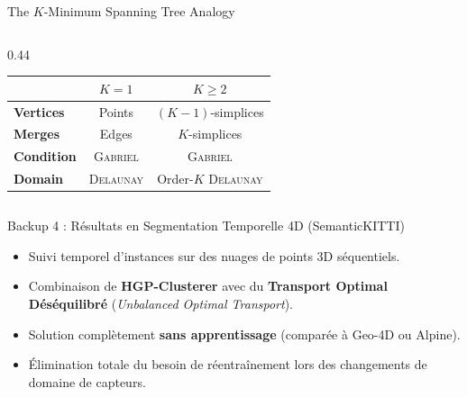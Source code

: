 \documentclass[A4,svgnames,9pt,aspectratio=169]{beamer}
\begin{document}
\begin{frame}{The $K$-Minimum Spanning Tree Analogy}
\begin{columns}[c, onlytextwidth]
\begin{column}{0.44\textwidth}
\begin{center}
                \vspace{0.5cm}
                \small
                \renewcommand{\arraystretch}{1.5}
                \begin{tabular}{lcc}
                    \toprule
                    & \textbf{$K = 1$} & \textbf{$K \ge 2$} \\
                    \midrule
                    \textbf{Vertices} & Points & $(K-1)$-simplices \\
                    \textbf{Merges} & Edges & $K$-simplices \\
                    \textbf{Condition} & \textsc{Gabriel} & \textsc{Gabriel} \\
                    \textbf{Domain} & \textsc{Delaunay} & Order-$K$ \textsc{Delaunay} \\
                    \bottomrule
                \end{tabular}
            \end{center}
        \end{column}
    \end{columns}
\end{frame}

\begin{frame}{Backup 4 : Résultats en Segmentation Temporelle 4D (SemanticKITTI)}
    \begin{itemize}
        \item Suivi temporel d'instances sur des nuages de points 3D séquentiels.
        \item Combinaison de \textbf{HGP-Clusterer} avec du \textbf{Transport Optimal Déséquilibré} (\emph{Unbalanced Optimal Transport}).
        \item Solution complètement \textbf{sans apprentissage} (comparée à Geo-4D ou Alpine).
        \item Élimination totale du besoin de réentraînement lors des changements de domaine de capteurs.
    \end{itemize}
\end{frame}
\end{document}
